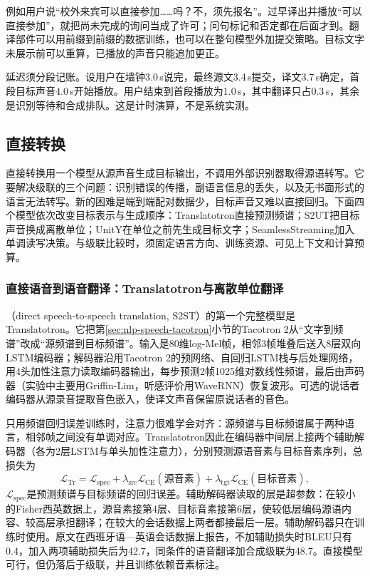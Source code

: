 例如用户说“校外来宾可以直接参加……吗？不，须先报名”。过早译出并播放“可以直接参加”，就把尚未完成的询问当成了许可；问句标记和否定都在后面才到。翻译部件可以用前缀到前缀的数据训练，也可以在整句模型外加提交策略。目标文字未展示前可以重算，已播放的声音只能追加更正。

延迟须分段记账。设用户在墙钟3.0\,s说完，最终源文3.4\,s提交，译文3.7\,s确定，首段目标声音4.0\,s开始播放。用户结束到首段播放为1.0\,s，其中翻译只占0.3\,s，其余是识别等待和合成排队。这是计时演算，不是系统实测。

\subsection{直接转换}
\label{sec:nlp-speech-direct-translation}

直接转换用一个模型从源声音生成目标输出，不调用外部识别器取得源语转写。它要解决级联的三个问题：识别错误的传播，副语言信息的丢失，以及无书面形式的语言无法转写。新的困难是端到端配对数据少，目标声音又难以直接回归。下面四个模型依次改变目标表示与生成顺序：Translatotron直接预测频谱；S2UT把目标声音换成离散单位；UnitY在单位之前先生成目标文字；SeamlessStreaming加入单调读写决策。与级联比较时，须固定语言方向、训练资源、可见上下文和计算预算。

\subsubsection{直接语音到语音翻译：Translatotron与离散单位翻译}
\label{sec:nlp-speech-translatotron}

（direct speech-to-speech translation, S2ST）的第一个完整模型是Translatotron。它把第\ref{sec:nlp-speech-tacotron}小节的Tacotron 2从“文字到频谱”改成“源频谱到目标频谱”。输入是80维log-Mel帧，相邻3帧堆叠后送入8层双向LSTM编码器；解码器沿用Tacotron 2的预网络、自回归LSTM栈与后处理网络，用4头加性注意力读取编码器输出，每步预测2帧1025维对数线性频谱，最后由声码器（实验中主要用Griffin-Lim，听感评价用WaveRNN）恢复波形。可选的说话者编码器从源录音提取音色嵌入，使译文声音保留原说话者的音色。

只用频谱回归误差训练时，注意力很难学会对齐：源频谱与目标频谱属于两种语言，相邻帧之间没有单调对应。Translatotron因此在编码器中间层上接两个辅助解码器（各为2层LSTM与单头加性注意力），分别预测源语音素与目标音素序列，总损失为
\begin{equation}
 \mathcal L_{\mathrm{Tr}}=\mathcal L_{\mathrm{spec}}
 +\lambda_{\mathrm{src}}\mathcal L_{\mathrm{CE}}(\text{源音素})
 +\lambda_{\mathrm{tgt}}\mathcal L_{\mathrm{CE}}(\text{目标音素}),
 \label{eq:nlp-speech-translatotron}
\end{equation}
$\mathcal L_{\mathrm{spec}}$是预测频谱与目标频谱的回归误差。辅助解码器读取的层是超参数：在较小的Fisher西英数据上，源音素接第4层、目标音素接第6层，使较低层编码源语内容、较高层承担翻译；在较大的会话数据上两者都接最后一层。辅助解码器只在训练时使用。原文在西班牙语—英语会话数据上报告，不加辅助损失时BLEU只有0.4，加入两项辅助损失后为42.7，同条件的语音翻译加合成级联为48.7。直接模型可行，但仍落后于级联，并且训练依赖音素标注。

